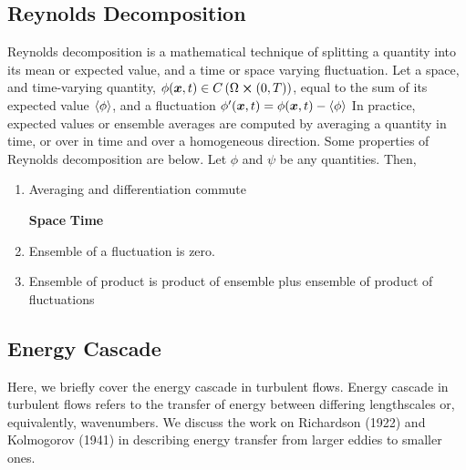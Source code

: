 \subsection{Reynolds Decomposition}
Reynolds decomposition is a mathematical technique of splitting a quantity into its mean or expected value, and a time or space varying fluctuation. Let a space, and time-varying quantity, $\phi(\boldsymbol{x},t)\in C\left(\Omega\cross(0,T)\right)$, equal to the sum of its expected value $\expval{\phi}$, and a fluctuation $\phi'(\boldsymbol{x},t)=\phi(\boldsymbol{x},t)-\expval{\phi}$
In practice, expected values or ensemble averages are computed by averaging a quantity in time, or over in time and over a homogeneous direction.
Some properties of Reynolds decomposition are below. Let $\phi$ and $\psi$ be any quantities. Then,
\begin{enumerate}
    \item Averaging and differentiation commute
    
    \textbf{Space}
    \textbf{Time}
    
    \item Ensemble of a fluctuation is zero.
    \item Ensemble of product is product of ensemble plus ensemble of product of fluctuations
\end{enumerate}



\subsection{Energy Cascade}
\label{sec:cascade}
Here, we briefly cover the energy cascade in turbulent flows. Energy cascade in turbulent flows refers to the transfer of energy between differing lengthscales or, equivalently, wavenumbers. We discuss the work on Richardson (1922) and Kolmogorov (1941) in describing energy transfer from larger eddies to smaller ones.

